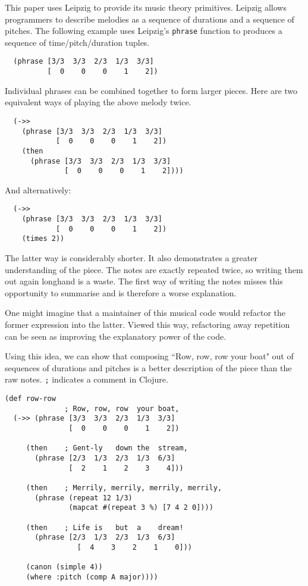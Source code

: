 \documentclass[numbers]{sigplanconf}
\begin{document}
This paper uses Leipzig to provide its music theory primitives. Leipzig allows programmers to describe melodies as a sequence
of durations and a sequence of pitches. The following example uses Leipzig's \verb|phrase| function to produces a sequence of
time/pitch/duration tuples.

\begin{verbatim}
  (phrase [3/3  3/3  2/3  1/3  3/3]
          [  0    0    0    1    2])
\end{verbatim}

Individual phrases can be combined together to form larger pieces. Here are two equivalent ways of playing the above melody twice.

\begin{verbatim}
  (->>
    (phrase [3/3  3/3  2/3  1/3  3/3]
            [  0    0    0    1    2])
    (then
      (phrase [3/3  3/3  2/3  1/3  3/3]
              [  0    0    0    1    2])))

\end{verbatim}

And alternatively:

\begin{verbatim}
  (->>
    (phrase [3/3  3/3  2/3  1/3  3/3]
            [  0    0    0    1    2])
    (times 2))
\end{verbatim}

The latter way is considerably shorter. It also demonstrates a greater understanding of the piece. The notes are exactly
repeated twice, so writing them out again longhand is a waste. The first way of writing the notes misses this opportunity to
summarise and is therefore a worse explanation.

One might imagine that a maintainer of this musical code would refactor the former expression into the latter. Viewed this way,
refactoring away repetition can be seen as improving the explanatory power of the code.

Using this idea, we can show that composing ``Row, row, row your boat" out of sequences of durations and pitches
is a better description of the piece than the raw notes. \verb|;| indicates a comment in Clojure.

\begin{verbatim}
(def row-row
              ; Row, row, row  your boat,
  (->> (phrase [3/3  3/3  2/3  1/3  3/3]
               [  0    0    0    1    2])

     (then    ; Gent-ly   down the  stream,
       (phrase [2/3  1/3  2/3  1/3  6/3]
               [  2    1    2    3    4]))

     (then    ; Merrily, merrily, merrily, merrily,
       (phrase (repeat 12 1/3)
               (mapcat #(repeat 3 %) [7 4 2 0])))

     (then    ; Life is   but  a    dream!
       (phrase [2/3  1/3  2/3  1/3  6/3]
                 [  4    3    2    1    0]))

     (canon (simple 4))
     (where :pitch (comp A major))))
\end{verbatim}
\end{document}
